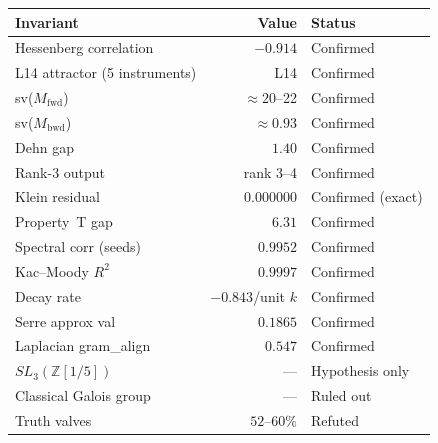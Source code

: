\documentclass[11pt,a4paper]{article}
\begin{document}
\begin{center}
\begin{tabular}{lrl}
\toprule
Invariant & Value & Status \\
\midrule
Hessenberg correlation & $-0.914$ & Confirmed \\
L14 attractor (5 instruments) & L14 & Confirmed \\
sv($M_\text{fwd}$) & $\approx 20$--22 & Confirmed \\
sv($M_\text{bwd}$) & $\approx 0.93$ & Confirmed \\
Dehn gap & $1.40$ & Confirmed \\
Rank-3 output & rank 3--4 & Confirmed \\
Klein residual & $0.000000$ & Confirmed (exact) \\
Property~T gap & $6.31$ & Confirmed \\
Spectral corr (seeds) & $0.9952$ & Confirmed \\
Kac--Moody $R^2$ & $0.9997$ & Confirmed \\
Decay rate & $-0.843$/unit $k$ & Confirmed \\
Serre approx val & $0.1865$ & Confirmed \\
Laplacian gram\_align & $0.547$ & Confirmed \\
\midrule
$SL_3(\mathbb{Z}[1/5])$ & --- & Hypothesis only \\
Classical Galois group & --- & Ruled out \\
Truth valves & $52$--$60\%$ & Refuted \\
\bottomrule
\end{tabular}
\end{center}
\end{document}
